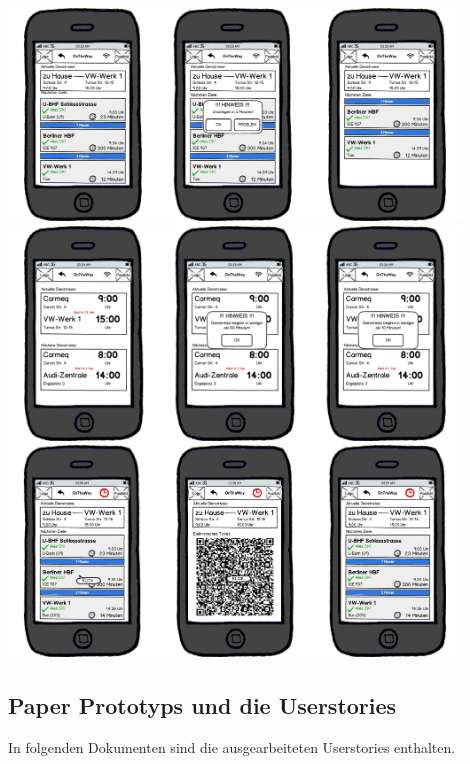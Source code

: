 \documentclass[12pt,a4paper]{article}
\begin{document}
\begin{center}
\includegraphics[width=12cm]{08_konvergenter_paperprototyp01_010.png}\\
\includegraphics[width=12cm]{08_konvergenter_paperprototyp01_011.png}\\
\includegraphics[width=12cm]{08_konvergenter_paperprototyp01_012.png}
\end{center}

\newpage
\vspace*{40mm}
\subsection{Paper Prototyps und die Userstories}

In folgenden Dokumenten sind die ausgearbeiteten Userstories enthalten.



\end{document}
